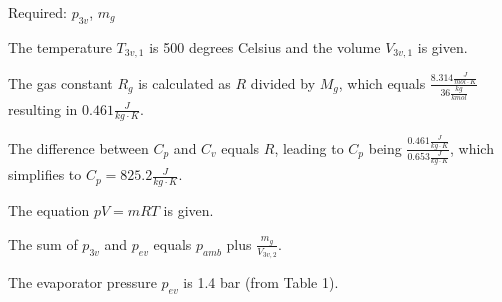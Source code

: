 Required: \( p_{3v} \), \( m_g \)

The temperature \( T_{3v,1} \) is 500 degrees Celsius and the volume \( V_{3v,1} \) is given.

The gas constant \( R_g \) is calculated as \( R \) divided by \( M_g \), which equals \( \frac{8.314 \frac{J}{mol \cdot K}}{36 \frac{kg}{kmol}} \) resulting in \( 0.461 \frac{J}{kg \cdot K} \).

The difference between \( C_p \) and \( C_v \) equals \( R \), leading to \( C_p \) being \( \frac{0.461 \frac{J}{kg \cdot K}}{0.653 \frac{J}{kg \cdot K}} \), which simplifies to \( C_p = 825.2 \frac{J}{kg \cdot K} \).

The equation \( pV = mRT \) is given.

The sum of \( p_{3v} \) and \( p_{ev} \) equals \( p_{amb} \) plus \( \frac{m_g}{V_{3v,2}} \).

The evaporator pressure \( p_{ev} \) is 1.4 bar (from Table 1).